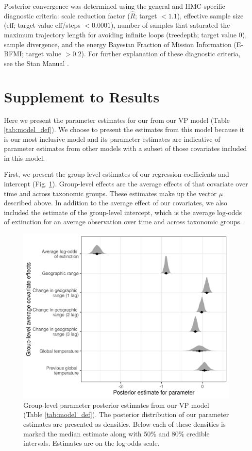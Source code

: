 \documentclass[12pt,letterpaper]{article}
\begin{document}
\begin{refsection}
Posterior convergence was determined using the general and HMC-specific diagnostic criteria: scale reduction factor (\(\hat{R}\); target \(<1.1\)), effective sample size (eff; target value eff/steps \(<0.0001\)), number of samples that saturated the maximum trajectory length for avoiding infinite loops (treedepth; target value 0), sample divergence, and the energy Bayesian Fraction of Mission Information (E-BFMI; target value \(>0.2\)). For further explanation of these diagnostic criteria, see the Stan Manual \citep{StanManual}.

\section{Supplement to Results} \label{sec:supp_res}

Here we present the parameter estimates for our from our VP model (Table \ref{tab:model_def}). We choose to present the estimates from this model because it is our most inclusive model and its parameter estimates are indicative of parameter estimates from other models with a subset of those covariates included in this model.

First, we present the group-level estimates of our regression coefficients and intercept (Fig. \ref{fig:param_est}). Group-level effects are the average effects of that covariate over time and across taxonomic groups. These estimates make up the vector $\mu$ described above. In addition to the average effect of our covariates, we also included the estimate of the group-level intercept, which is the average log-odds of extinction for an average observation over time and across taxonomic groups.

\begin{figure}[ht]
  \centering
  \includegraphics[width=\textwidth,height=\textheight,keepaspectratio=true]{../results/figure/effect_est}
  \caption{Group-level parameter posterior estimates from our VP model (Table \ref{tab:model_def}). The posterior distribution of our parameter estimates are presented as densities. Below each of these densities is marked the median estimate along with 50\% and 80\% credible intervals. Estimates are on the log-odds scale.}
  \label{fig:param_est}
\end{figure}


\end{refsection}
\end{document}
